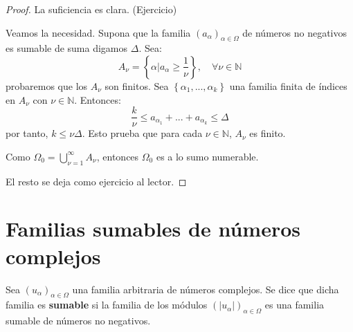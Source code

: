\documentclass[12pt]{report}
\newcounter{it}
\theoremstyle{largebreak}
\newcommand\abs[1]{\ensuremath{\big|#1\big|}}
\begin{document}
    \begin{proof}
        La suficiencia es clara. (Ejercicio) %

        Veamos la necesidad. Supona que la familia $(a_\alpha)_{\alpha\in\Omega}$ de números no negativos es sumable de suma digamos $\Delta$. Sea:
        \begin{equation*}
            A_\nu=\left\{\alpha\Big|a_\alpha\geq\frac{1}{\nu} \right\},\quad\forall\nu\in\mathbb{N}
        \end{equation*}
        probaremos que los $A_\nu$ son finitos. Sea $\left\{\alpha_1,...,\alpha_k\right\}$ una familia finita de índices en $A_\nu$ con $\nu\in\mathbb{N}$. Entonces:
        \begin{equation*}
            \frac{k}{\nu}\leq a_{\alpha_1}+...+a_{\alpha_k}\leq\Delta
        \end{equation*}
        por tanto, $k\leq \nu\Delta$. Esto prueba que para cada $\nu\in\mathbb{N}$, $A_\nu$ es finito.

        Como $\Omega_0=\bigcup_{\nu=1 }^\infty A_\nu$, entonces $\Omega_0$ es a lo sumo numerable.

        El resto se deja como ejercicio al lector.
    \end{proof}

    \section{Familias sumables de números complejos}

    \begin{mydef}
        Sea $\left(u_\alpha \right)_{\alpha\in\Omega}$ una familia arbitraria de números complejos. Se dice que dicha familia es \textbf{sumable} si la familia de los módulos $\left(\abs{u_\alpha } \right)_{\alpha\in\Omega}$ es una familia sumable de números no negativos.
    \end{mydef}
\end{document}

